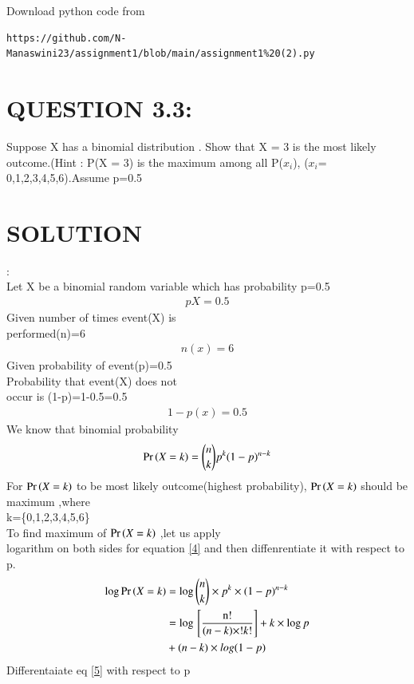 \documentclass[journal,12pt,twocolumn]{IEEEtran}
\begin{document}
\renewcommand{\thefigure}{\theenumi}
\renewcommand{\thetable}{\theenumi}
Download python code from 
\begin{lstlisting}
https://github.com/N-Manaswini23/assignment1/blob/main/assignment1%20(2).py
\end{lstlisting}
%



\section*{ QUESTION 3.3:}
Suppose X has a binomial
 distribution . Show that X = 3 is the most likely outcome.(Hint : P(X = 3) is the maximum among all P($x_i$), ($x_i$= 0,1,2,3,4,5,6).Assume p=0.5 
 \\
\section*{SOLUTION}:\\
Let X be a binomial random variable which has probability p=0.5\\
 \begin{align}
p{X}=0.5 \label{1}
 \end{align}
Given number of times event(X) is\\
 performed(n)=6\\
 \begin{align}
 n(x)=6 \label{2}
 \end{align}
Given probability of event(p)=0.5\\
Probability that event(X) does not \\occur is
(1-p)=1-0.5=0.5\\
 \begin{align}
1-p(x)=0.5 \label{3}
 \end{align}
We know that binomial probability\\
\begin{align}
\Pr\left(X=k\right)= \binom{n}{k}p^k({1-p})^{n-k}  \label{4} 
\end{align}
For $\Pr\left(X=k\right)$ to be most likely outcome(highest probability),
 $\Pr\left(X=k\right)$  should be maximum ,where\\
 k=\{0,1,2,3,4,5,6\}\\
To find maximum of  $\Pr\left(X=k\right)$  ,let us  apply \\logarithm on both sides for equation \eqref{4} and then diffenrentiate it with respect
to p.
\begin{align}
\log  \Pr\left(X=k\right) &=\log \binom{n}{k}\times p^k\times ({1-p})^{n-k} \\
&=\log{}\left[\frac{\text n!}{\text (n-k)\times !k!}\right]+k \times \log p \notag \\
 &+(n-k)\times log (1-p) \label{5}
\end{align}
Differentaiate eq \eqref{5} with respect to p
\end{document}
